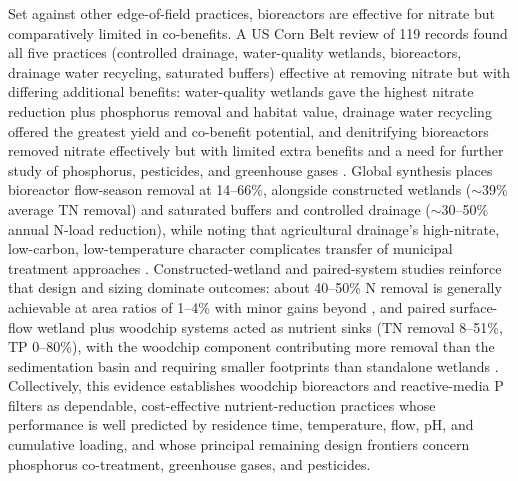 Set against other edge-of-field practices, bioreactors are effective for nitrate but comparatively limited in co-benefits. A US Corn Belt review of 119 records found all five practices (controlled drainage, water-quality wetlands, bioreactors, drainage water recycling, saturated buffers) effective at removing nitrate but with differing additional benefits: water-quality wetlands gave the highest nitrate reduction plus phosphorus removal and habitat value, drainage water recycling offered the greatest yield and co-benefit potential, and denitrifying bioreactors removed nitrate effectively but with limited extra benefits and a need for further study of phosphorus, pesticides, and greenhouse gases \parencite{Mitchell2023}. Global synthesis places bioreactor flow-season removal at 14--66\%, alongside constructed wetlands ($\sim$39\% average TN removal) and saturated buffers and controlled drainage ($\sim$30--50\% annual N-load reduction), while noting that agricultural drainage's high-nitrate, low-carbon, low-temperature character complicates transfer of municipal treatment approaches \parencite{Wang2025b}. Constructed-wetland and paired-system studies reinforce that design and sizing dominate outcomes: about 40--50\% N removal is generally achievable at area ratios of 1--4\% with minor gains beyond \parencite{Mendes2021}, and paired surface-flow wetland plus woodchip systems acted as nutrient sinks (TN removal 8--51\%, TP 0--80\%), with the woodchip component contributing more removal than the sedimentation basin and requiring smaller footprints than standalone wetlands \parencite{Pugliese2020}. Collectively, this evidence establishes woodchip bioreactors and reactive-media P filters as dependable, cost-effective nutrient-reduction practices whose performance is well predicted by residence time, temperature, flow, pH, and cumulative loading, and whose principal remaining design frontiers concern phosphorus co-treatment, greenhouse gases, and pesticides.